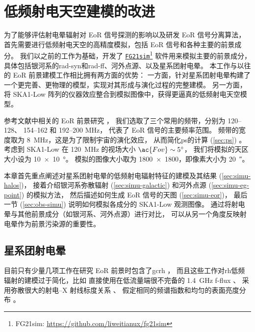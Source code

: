 

\chapter{低频射电天空建模的改进}
\label{chap:simulation}

为了能够评估射电晕辐射对 EoR 信号探测的影响以及研发 EoR 信号分离算法，
首先需要进行低频射电天空的高精度模拟，包括 EoR 信号和各种主要的前景成分。
我们以之前的工作\cite{wang2010,wang2013}为基础，开发了
\href{https://github.com/liweitianux/fg21sim}{\texttt{FG21sim}}\footnote{%
  FG21sim: \url{https://github.com/liweitianux/fg21sim}}
软件用来模拟主要的前景成分，
具体包括银河系的\ac{rad-syn}和\ac{rad-ff}、河外点源、以及星系团射电晕。
本工作与以往的 EoR 前景建模工作相比拥有两方面的优势：
一方面，针对星系团射电晕构建了一个更完善、更物理的模型，实现对其形成与演化过程的完整建模。
另一方面，将 SKA1-Low 阵列的仪器效应整合到模拟图像中，获得更逼真的低频射电天空模型。

参考文献中相关的 EoR 前景研究 \cite{liu2009ps,datta2010,chapman2012,sims2016}，
我们选取了三个常用的频带，分别为 \numrange{120}{128}、
\numrange{154}{162} 和 \numrange{192}{200} \si{\MHz}，
代表了 EoR 信号的主要频率范围。
频带的宽度取为 \SI{8}{\MHz}，这是为了限制宇宙的演化效应，
从而简化\ac{ps}的计算 (\autoref{sec:ps}) \cite{wyithe2004,thyagarajan2013}。
考虑到 SKA1-Low 在 \SI{120}{\MHz} 的视场大小 $\ac{Fov} \sim \SI{5}{\degree}$，
我们将模拟的天区大小设为 \SI{10 x 10}{\degree}。
模拟的图像大小取为 \num{1800 x 1800}，即像素大小为 \SI{20}{\arcsecond}。

本章首先重点阐述对星系团射电晕的低频射电辐射特征的建模及其结果
(\autoref{sec:simu-halos})，
接着介绍银河系弥散辐射 (\autoref{sec:simu-galactic})
和河外点源 (\autoref{sec:simu-eg-point}) 的模拟方法，
然后描述如何生成 EoR 信号的天图 (\autoref{sec:simu-eor})，
最后一节 (\autoref{sec:obs-simu}) 说明如何模拟各成分的 SKA1-Low 观测图像。
通过将射电晕与其他前景成分（如银河系、河外点源）进行对比，
可以从另一个角度反映射电晕作为前景污染源的重要性。


\section{星系团射电晕}
\label{sec:simu-halos}

目前只有少量几项工作在研究 EoR 前景时包含了\ac{gc}\ac{rh}
\cite{diMatteo2004,gleser2008,jelic2008}，
而且这些工作对\ac{rh}低频辐射的建模过于简化，比如
直接使用在低流量端很不完备的 \SI{1.4}{\GHz} \ac{f-flux} \cite{gleser2008}、
采用弥散很大的射电--X 射线标度关系 \cite{jelic2008}、
假定相同的频谱指数和均匀的表面亮度分布 \cite{gleser2008,jelic2008}。

